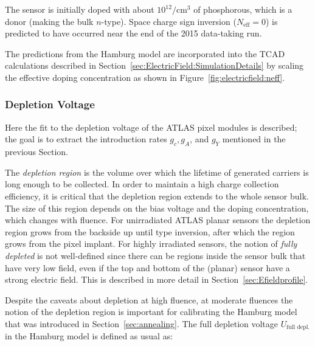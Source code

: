 The sensor is initially doped with about $10^{12}/\text{cm}^3$ of phosphorous, which is a donor (making the bulk $n$-type).  Space charge sign inversion ($N_\text{eff}=0$) is predicted to have occurred near the end of the 2015 data-taking run.

The predictions from the Hamburg model are incorporated into the TCAD calculations described in Section~\ref{sec:ElectricField:SimulationDetails} by scaling the effective doping concentration as shown in Figure~\ref{fig:electricfield:neff}.    

\subsubsection{Depletion Voltage}
\label{sec:depletionvoltage}
Here the fit to the depletion voltage of the ATLAS pixel modules is described; the goal is to extract the  introduction rates $g_c,g_A$, and $g_Y$  mentioned in the previous Section.

The \textit{depletion region} is the volume over which the lifetime of generated carriers is long enough to be collected.  In order to maintain a high charge collection efficiency, it is critical that the depletion region extends to the whole sensor bulk.  The size of this region depends on the bias voltage and the doping concentration, which changes with fluence.   For unirradiated ATLAS planar sensors the depletion region grows from the backside up until type inversion, after which the region grows from the pixel implant.  For highly irradiated sensors, the notion of \textit{fully depleted} is not well-defined since there can be regions inside the sensor bulk that have very low field, even if the top and bottom of the (planar) sensor have a strong electric field.  This is described in more detail in Section~\ref{sec:Efieldprofile}.

 Despite the caveats about depletion at high fluence, at moderate fluences the notion of the depletion region is important for calibrating the Hamburg model that was introduced in Section~\ref{sec:annealing}.  The full depletion voltage $U_\text{full depl.}$ in the Hamburg model is defined as usual as:

